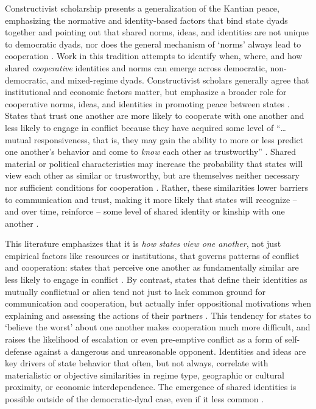 \documentclass[10pt,]{article}
\begin{document}
Constructivist scholarship presents a generalization of the Kantian
peace, emphasizing the normative and identity-based factors that bind
state dyads together and pointing out that shared norms, ideas, and
identities are not unique to democratic dyads, nor does the general
mechanism of `norms' always lead to cooperation
\citetext{\citealp[e.g.][863]{Ruggie1998}; \citealp[402-404]{Finnemore2001}}.
Work in this tradition attempts to identify when, where, and how shared
\emph{cooperative} identities and norms can emerge across democratic,
non-democratic, and mixed-regime dyads. Constructivist scholars
generally agree that institutional and economic factors matter, but
emphasize a broader role for cooperative norms, ideas, and identities in
promoting peace between states \citep[229]{Wendt1999}. States that trust
one another are more likely to cooperate with one another and less
likely to engage in conflict because they have acquired some level of
``\ldots{} mutual responsiveness, that is, they may gain the ability to
more or less predict one another's behavior and come to \emph{know} each
other as trustworthy'' \citep[254]{Adler1997a}. Shared material or
political characteristics may increase the probability that states will
view each other as similar or trustworthy, but are themselves neither
necessary nor sufficient conditions for cooperation
\citep[19]{Kivimaki2001}. Rather, these similarities lower barriers to
communication and trust, making it more likely that states will
recognize -- and over time, reinforce -- some level of shared identity
or kinship with one another
\citetext{\citealp[1158]{Doyle1986a}; \citealp[862-863]{Ruggie1998}}.

This literature emphasizes that it is \emph{how states view one
another}, not just empirical factors like resources or institutions,
that governs patterns of conflict and cooperation: states that perceive
one another as fundamentally similar are less likely to engage in
conflict \citep[416-417]{Peceny1997}. By contrast, states that define
their identities as mutually conflictual or alien tend not just to lack
common ground for communication and cooperation, but actually infer
oppositional motivations when explaining and assessing the actions of
their partners \citep[502-504]{RisseKappen1995}. This tendency for
states to `believe the worst' about one another makes cooperation much
more difficult, and raises the likelihood of escalation or even
pre-emptive conflict as a form of self-defense against a dangerous and
unreasonable opponent. Identities and ideas are key drivers of state
behavior that often, but not always, correlate with materialistic or
objective similarities in regime type, geographic or cultural proximity,
or economic interdependence. The emergence of shared identities is
possible outside of the democratic-dyad case, even if it less common
\citep[18-19]{Peceny2002}.
\end{document}
